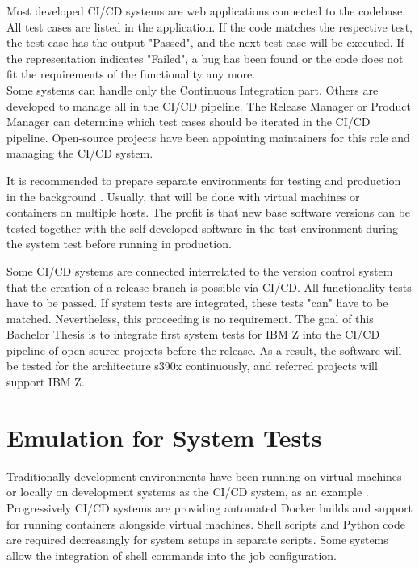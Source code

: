 Most developed \gls{CI/CD} systems are web applications connected to the codebase. All test cases are listed in the application. If the code matches the respective test, the test case has the output "Passed", and the next test case will be executed. If the representation indicates "Failed", a bug has been found or the code does not fit the requirements of the functionality any more. \\
Some systems can handle only the Continuous Integration part. Others are developed to manage all in the \gls{CI/CD} pipeline.
The Release Manager or Product Manager can determine which test cases should be iterated in the \gls{CI/CD} pipeline. Open-source projects have been appointing maintainers for this role and managing the \gls{CI/CD} system.

It is recommended to prepare separate environments for testing and production in the background \cite[~p.120]{Scholl2019}. 
Usually, that will be done with virtual machines or containers on multiple hosts. The profit is that new base software versions can be tested together with the self-developed software in the test environment during the system test before running in production.

Some \gls{CI/CD} systems are connected interrelated to the version control system that the creation of a release branch is possible via \gls{CI/CD}. All functionality tests have to be passed.  If system tests are integrated, these tests "can" have to be matched. Nevertheless, this proceeding is no requirement. The goal of this Bachelor Thesis is to integrate first system tests for IBM Z into the \gls{CI/CD} pipeline of open-source projects before the release. As a result, the software will be tested for the architecture s390x continuously, and referred projects will support IBM Z.

\section{Emulation for System Tests}

Traditionally development environments have been running on virtual machines or locally on development systems as the \gls{CI/CD} system, as an example \cite[~p.123]{Scholl2019}. Progressively \gls{CI/CD} systems are providing automated Docker builds and support for running containers alongside virtual machines. 
Shell scripts and Python code are required decreasingly for system setups in separate scripts. Some systems allow the integration of shell commands into the job configuration.

